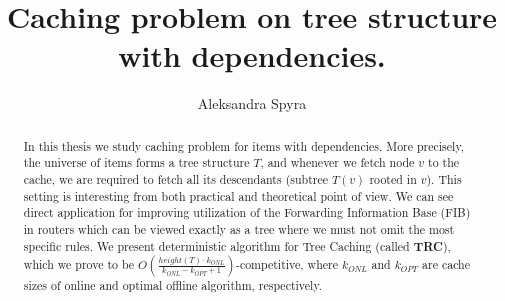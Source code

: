 \documentclass[a4paper,10pt]{article}
\title{Caching problem on tree structure with dependencies.}
\author{Aleksandra Spyra}
\begin{document}
\maketitle

\begin{abstract}
In this thesis we study caching problem for items with dependencies.
More precisely, the universe of items forms a tree structure $T$, and whenever
we fetch node $v$ to the cache, we are required to fetch all its descendants
(subtree $T(v)$ rooted in $v$). This setting is interesting from both practical 
and theoretical point of view. We can see direct application for improving 
utilization of the Forwarding Information Base (FIB) in routers which can be 
viewed exactly as a tree where we must not omit the most specific rules. We 
present deterministic algorithm for Tree Caching (called \textbf{TRC}), which 
we 
prove to be $O(\frac{height(T) \cdot k_{ONL}}{k_{ONL} - k_{OPT} + 
1})$-competitive, 
where $k_{ONL}$ and $k_{OPT}$ are cache sizes of online and optimal offline 
algorithm, respectively. 
\end{abstract}

\tableofcontents




\printbibliography
\end{document}

